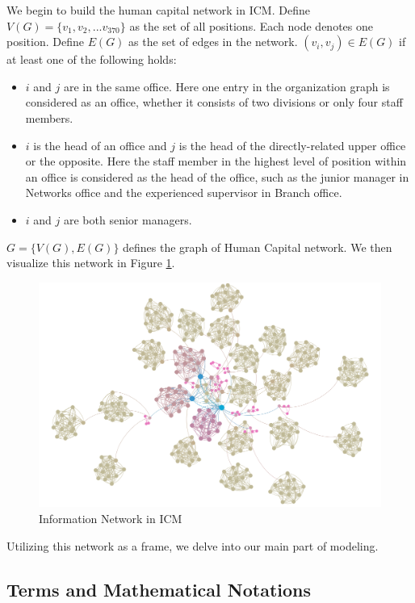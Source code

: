 \documentclass[tcn = 37075, sheet = false, abstract = false]{mcmthesis}
\begin{document}
We begin to build the human capital network in ICM. Define $V(G)=\{v_1,v_2,...v_{370}\}$ as the set of all positions. Each node denotes one position. Define $E(G)$ as the set of edges in the network. $(v_i,v_j)\in E(G)$ if at least one of the following holds:

\begin{itemize}
\item $i$ and $j$ are in the same office. Here one entry in the organization graph is considered as an office, whether it consists of two divisions or only four staff members.
\item $i$ is the head of an office and $j$ is the head of the directly-related upper office or the opposite. Here the staff member in the highest level of position within an office is considered as the head of the office, such as the junior manager in Networks office and the experienced supervisor in Branch office.
\item $i$ and $j$ are both senior managers.
\end{itemize}

$G=\{V(G),E(G)\}$ defines the graph of Human Capital network. We then visualize this network in Figure \ref{fig:Information Network in ICM}.

\begin{figure}[htb!]
\small
\centering
\includegraphics[width=14cm]{figure_2.png}
\caption{Information Network in ICM} \label{fig:Information Network in ICM}
\end{figure}

Utilizing this network as a frame, we delve into our main part of modeling.

\subsection{Terms and Mathematical Notations}
\end{document}

